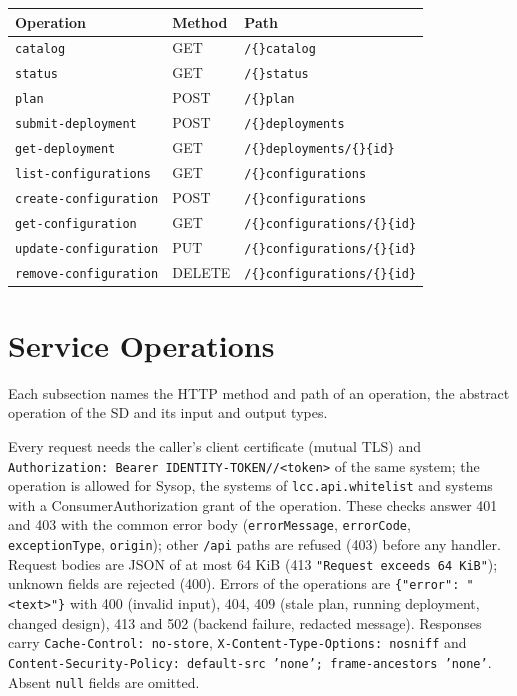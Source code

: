 \documentclass[a4paper]{arrowhead}
\begin{document}
\noindent\begin{longtable}{| p{5.2cm} | p{1.8cm} | p{8.2cm} |} \hline
\rowcolor{gray!33} Operation & Method & Path \\ \hline \endhead
\texttt{catalog} & GET & \texttt{/\allowbreak\{\}catalog} \\ \hline
\texttt{status} & GET & \texttt{/\allowbreak\{\}status} \\ \hline
\texttt{plan} & POST & \texttt{/\allowbreak\{\}plan} \\ \hline
\texttt{submit-deployment} & POST & \texttt{/\allowbreak\{\}deployments} \\ \hline
\texttt{get-deployment} & GET & \texttt{/\allowbreak\{\}deployments/\allowbreak\{\}\{id\}} \\ \hline
\texttt{list-configurations} & GET & \texttt{/\allowbreak\{\}configurations} \\ \hline
\texttt{create-configuration} & POST & \texttt{/\allowbreak\{\}configurations} \\ \hline
\texttt{get-configuration} & GET & \texttt{/\allowbreak\{\}configurations/\allowbreak\{\}\{id\}} \\ \hline
\texttt{update-configuration} & PUT & \texttt{/\allowbreak\{\}configurations/\allowbreak\{\}\{id\}} \\ \hline
\texttt{remove-configuration} & DELETE & \texttt{/\allowbreak\{\}configurations/\allowbreak\{\}\{id\}} \\ \hline
\end{longtable}

\newpage

\section{Service Operations}
\label{sec:operations}

Each subsection names the HTTP method and path of an operation, the abstract operation of the SD and its input and output types.

Every request needs the caller's client certificate (mutual TLS) and \texttt{Authorization:\allowbreak{} Bearer IDENTITY-\allowbreak{}TOKEN/\allowbreak{}/\allowbreak{}<token>} of the same system; the operation is allowed for Sysop, the systems of \texttt{lcc.\allowbreak{}api.\allowbreak{}whitelist} and systems with a ConsumerAuthorization grant of the operation. These checks answer 401 and 403 with the common error body (\texttt{errorMessage}, \texttt{errorCode}, \texttt{exceptionType}, \texttt{origin}); other \texttt{/api} paths are refused (403) before any handler. Request bodies are JSON of at most 64 KiB (413 \texttt{"Request exceeds 64 KiB"}); unknown fields are rejected (400). Errors of the operations are \texttt{\{"error": "<text>"\}} with 400 (invalid input), 404, 409 (stale plan, running deployment, changed design), 413 and 502 (backend failure, redacted message). Responses carry \texttt{Cache-Control: no-store}, \texttt{X-Content-Type-Options: nosniff} and \texttt{Content-Security-Policy: default-src 'none'; frame-ancestors 'none'}. Absent \texttt{null} fields are omitted.
\end{document}
